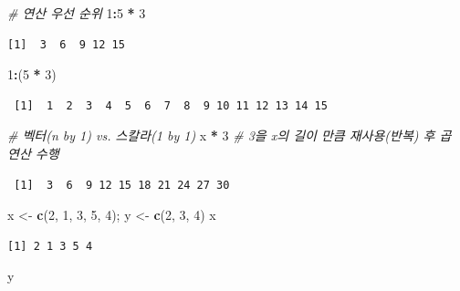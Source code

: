 \documentclass[
  11pt,
]{krantz}
\newenvironment{Shaded}{\begin{snugshade}}{\end{snugshade}}
\newcommand{\CommentTok}[1]{\textcolor[rgb]{0.37,0.37,0.37}{\textit{#1}}}
\newcommand{\DecValTok}[1]{\textcolor[rgb]{0.06,0.06,0.06}{#1}}
\newcommand{\KeywordTok}[1]{\textcolor[rgb]{0.27,0.27,0.27}{\textbf{#1}}}
\newcommand{\NormalTok}[1]{#1}
\newcommand{\OperatorTok}[1]{\textcolor[rgb]{0.43,0.43,0.43}{\textbf{#1}}}
\newcommand{\StringTok}[1]{\textcolor[rgb]{0.5,0.5,0.5}{#1}}
\begin{document}
\begin{Shaded}
\begin{Highlighting}[]
\CommentTok{# 연산 우선 순위}
\DecValTok{1}\OperatorTok{:}\DecValTok{5} \OperatorTok{*}\StringTok{ }\DecValTok{3}
\end{Highlighting}
\end{Shaded}

\begin{verbatim}
[1]  3  6  9 12 15
\end{verbatim}

\begin{Shaded}
\begin{Highlighting}[]
\DecValTok{1}\OperatorTok{:}\NormalTok{(}\DecValTok{5} \OperatorTok{*}\StringTok{ }\DecValTok{3}\NormalTok{)}
\end{Highlighting}
\end{Shaded}

\begin{verbatim}
 [1]  1  2  3  4  5  6  7  8  9 10 11 12 13 14 15
\end{verbatim}

\begin{Shaded}
\begin{Highlighting}[]
\CommentTok{# 벡터(n by 1) vs. 스칼라(1 by 1)}
\NormalTok{x }\OperatorTok{*}\StringTok{ }\DecValTok{3} \CommentTok{# 3을 x의 길이 만큼 재사용(반복) 후 곱 연산 수행}
\end{Highlighting}
\end{Shaded}

\begin{verbatim}
 [1]  3  6  9 12 15 18 21 24 27 30
\end{verbatim}

\begin{Shaded}
\begin{Highlighting}[]
\NormalTok{x <-}\StringTok{ }\KeywordTok{c}\NormalTok{(}\DecValTok{2}\NormalTok{, }\DecValTok{1}\NormalTok{, }\DecValTok{3}\NormalTok{, }\DecValTok{5}\NormalTok{, }\DecValTok{4}\NormalTok{); y <-}\StringTok{ }\KeywordTok{c}\NormalTok{(}\DecValTok{2}\NormalTok{, }\DecValTok{3}\NormalTok{, }\DecValTok{4}\NormalTok{)}
\NormalTok{x}
\end{Highlighting}
\end{Shaded}

\begin{verbatim}
[1] 2 1 3 5 4
\end{verbatim}

\begin{Shaded}
\begin{Highlighting}[]
\NormalTok{y}
\end{Highlighting}
\end{Shaded}
\end{document}
